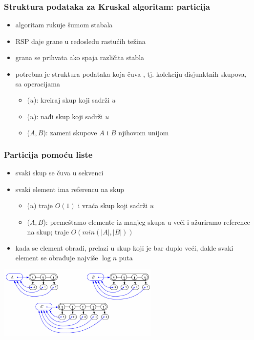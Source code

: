 \documentclass[compress,aspectratio=169]{beamer}
\begin{document}
\begin{frame}[fragile]
  \frametitle{Struktura podataka za Kruskal algoritam: particija}
  \begin{itemize}
    \item algoritam rukuje šumom stabala
    \item RSP daje grane u redosledu rastućih težina
    \item grana se prihvata ako spaja različita stabla
    \item potrebna je struktura podataka koja čuva ,
      tj. kolekciju disjunktnih skupova, sa operacijama
    \begin{itemize}
      \item {}($u$): kreiraj skup koji sadrži $u$
      \item {}($u$): nađi skup koji sadrži $u$
      \item {}($A,B$): zameni skupove $A$ i $B$ njihovom 
        unijom
    \end{itemize}
  \end{itemize}
\end{frame}

\begin{frame}[fragile]
  \frametitle{Particija pomoću liste}
  \begin{itemize}
    \item svaki skup se čuva u sekvenci
    \item svaki element ima referencu na skup
    \begin{itemize}
      \item {}($u$) traje $O(1)$ i vraća skup koji sadrži $u$
      \item {}($A,B$): premeštamo elemente iz manjeg skupa u
        veći i ažuriramo reference na skup; traje $O(min(|A|,|B|))$
    \end{itemize}
    \item kada se element obradi, prelazi u skup koji je bar duplo veći,
      dakle svaki element se obrađuje najviše $\log n$ puta
  \end{itemize}
  \begin{center}
    \includegraphics[width=8cm]{asp-14-pic77.png}
  \end{center}
\end{frame}
\end{document}

